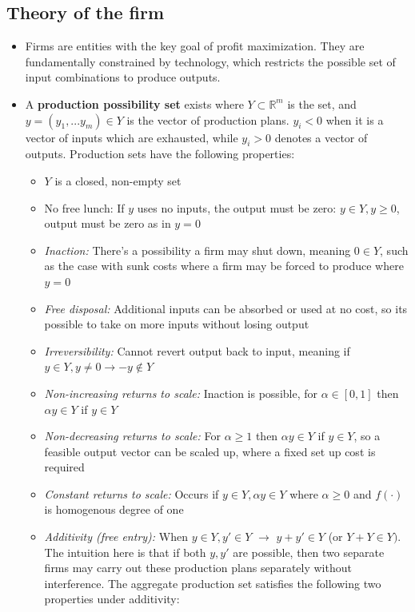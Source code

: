 \documentclass{article}
\begin{document}
\subsection{Theory of the firm}
\begin{itemize}
    \item Firms are entities with the key goal of profit maximization. They are fundamentally constrained by technology, which restricts the possible set of input combinations to produce outputs. 
    \item A \textbf{production possibility set} exists where $Y \subset \mathbb{R}^m$ is the set, and $y = (y_1, ... y_m) \in Y$ is the vector of production plans. $y_i < 0$ when it is a vector of inputs which are exhausted, while $y_i > 0$ denotes a vector of outputs. Production sets have the following properties:
    \begin{itemize}
        \item $Y$ is a closed, non-empty set 
        \item No free lunch: If $y$ uses no inputs, the output must be zero: $y \in Y, y \geq 0$, output must be zero as in $y=0$
        \item \textit{Inaction:} There's a possibility a firm may shut down, meaning $0 \in Y$, such as the case with sunk costs where a firm may be forced to produce where $y=0$
        \item \textit{Free disposal:} Additional inputs can be absorbed or used at no cost, so its possible to take on more inputs without losing output
        \item \textit{Irreversibility:} Cannot revert output back to input, meaning if $y \in Y, y \neq 0 \rightarrow -y \notin Y$
        \item \textit{Non-increasing returns to scale:} Inaction is possible, for $\alpha \in [0,1]$ then $\alpha y \in Y$ if $y \in Y$
        \item \textit{Non-decreasing returns to scale:} For $\alpha \geq 1$ then $\alpha y \in Y$ if $y \in Y$, so a feasible output vector can be scaled up, where a fixed set up cost is required 
        \item \textit{Constant returns to scale:} Occurs if $y \in Y, \alpha y \in Y$ where $\alpha \geq 0$ and $f(\cdot)$ is homogenous degree of one
        \item \textit{Additivity (free entry):} When $y \in Y, y' \in Y$ $\rightarrow$ $y + y' \in Y$ (or $Y + Y \in Y)$. The intuition here is that if both $y, y'$ are possible, then two separate firms may carry out these production plans separately without interference. The aggregate production set satisfies the following two properties under additivity:

\end{itemize}
\end{itemize}
\end{document}
